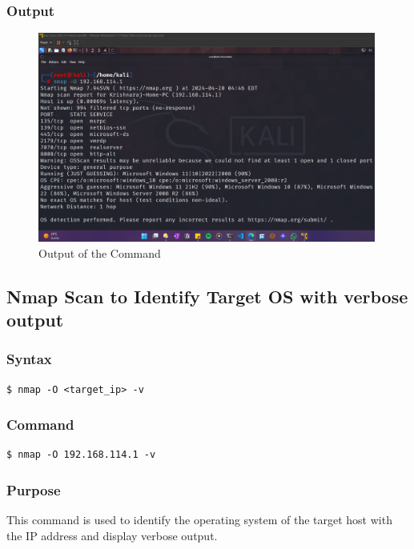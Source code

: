 \documentclass[11pt]{article}
\begin{document}
\subsubsection*{Output}
\begin{figure}[H]
    \centering
    \includegraphics[width=0.99\textwidth]{a3_ss .png}
    \caption{Output of the Command}
\end{figure}

\subsection{Nmap Scan to Identify Target OS with verbose output}

\subsubsection*{Syntax}
\begin{verbatim}
$ nmap -O <target_ip> -v
\end{verbatim}

\subsubsection*{Command}
\begin{verbatim}
$ nmap -O 192.168.114.1 -v
\end{verbatim}

\subsubsection*{Purpose}
This command is used to identify the operating system of the target host with the IP address and display verbose output.
\end{document}
